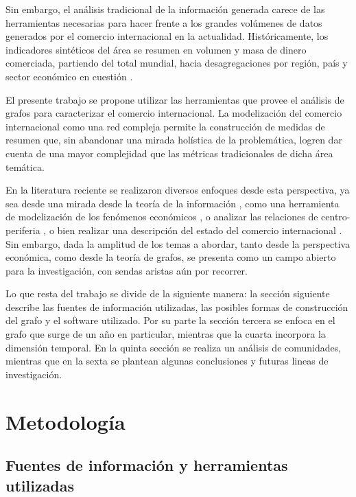 \documentclass[runningheads,a4paper]{llncs}
\begin{document}
Sin embargo, el análisis tradicional  de la información generada carece de las herramientas necesarias para hacer frente a los grandes volúmenes de datos generados por el comercio internacional en la actualidad. Históricamente, los indicadores sintéticos del área se resumen en volumen y masa de dinero comerciada, partiendo del total mundial, hacia desagregaciones por región, país y sector económico en cuestión \cite{WTO2017}.                

El presente trabajo se propone utilizar las herramientas que provee el análisis de grafos para caracterizar el comercio internacional. La modelización del comercio internacional como una red compleja permite la construcción de medidas de resumen que, sin abandonar una mirada holística de la problemática, logren dar cuenta de una mayor complejidad que las métricas tradicionales de dicha área temática. 

En la literatura reciente se realizaron diversos enfoques desde esta perspectiva, ya sea desde una mirada desde la teoría de la información \cite{Bhattacharya2008},  como una herramienta de modelización de los fenómenos económicos \cite{Fan2014}, o analizar las relaciones de centro-periferia \cite{Fagiolo2010}, o bien realizar una descripción del estado del comercio internacional \cite{Chow2013}. Sin embargo, dada la amplitud de los temas a abordar, tanto desde la perspectiva económica, como desde la teoría de grafos, se presenta como un campo abierto para la investigación, con sendas aristas aún por recorrer.        

Lo que resta del trabajo se divide de la siguiente manera: la sección siguiente describe las fuentes de información utilizadas, las posibles formas de construcción del grafo y el software utilizado. Por su parte la sección tercera se enfoca en el grafo que surge de un año en particular, mientras que la cuarta incorpora la dimensión temporal. En la quinta sección se realiza un análisis de comunidades, mientras que en la sexta se plantean algunas conclusiones y futuras lineas de investigación.

\section{Metodología}

\subsection{Fuentes de información y herramientas utilizadas}
\end{document}
